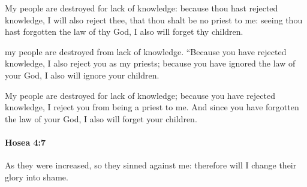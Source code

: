 			\begin{versebox}
					\item[BHS] 
					\item[LXX] 
					\item[ASV] My people are destroyed for lack of knowledge: because thou hast rejected knowledge, I will also reject thee, that thou shalt be no priest to me: seeing thou hast forgotten the law of thy God, I also will forget thy children.
					\item[NIV] my people are destroyed from lack of knowledge. “Because you have rejected knowledge, I also reject you as my priests; because you have ignored the law of your God, I also will ignore your children.
					\item[NRSV] My people are destroyed for lack of knowledge; because you have rejected knowledge, I reject you from being a priest to me. And since you have forgotten the law of your God, I also will forget your children.
			\end{versebox}

		\paragraph{Hosea 4:7} %
			\label{HOSEA-4-7}

			As they were increased, so they sinned against me: therefore will I change their glory into shame.

